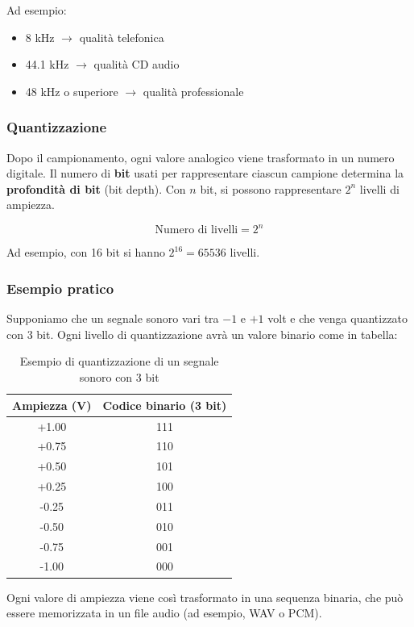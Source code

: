 \documentclass[12pt]{article}
\begin{document}
Ad esempio:
\begin{itemize}
    \item 8 kHz $\rightarrow$ qualità telefonica
    \item 44.1 kHz $\rightarrow$ qualità CD audio
    \item 48 kHz o superiore $\rightarrow$ qualità professionale
\end{itemize}

\subsubsection{Quantizzazione}

Dopo il campionamento, ogni valore analogico viene trasformato in un numero digitale.  
Il numero di \textbf{bit} usati per rappresentare ciascun campione determina la \textbf{profondità di bit} (bit depth).  
Con $n$ bit, si possono rappresentare $2^n$ livelli di ampiezza.

\[
\text{Numero di livelli} = 2^n
\]

Ad esempio, con 16 bit si hanno $2^{16} = 65536$ livelli.

\subsubsection{Esempio pratico}

Supponiamo che un segnale sonoro vari tra $-1$ e $+1$ volt e che venga quantizzato con 3 bit.  
Ogni livello di quantizzazione avrà un valore binario come in tabella:

\begin{table}[h]
\centering
\begin{tabular}{|c|c|}
\hline
\textbf{Ampiezza (V)} & \textbf{Codice binario (3 bit)} \\
\hline
+1.00 & 111 \\
+0.75 & 110 \\
+0.50 & 101 \\
+0.25 & 100 \\
-0.25 & 011 \\
-0.50 & 010 \\
-0.75 & 001 \\
-1.00 & 000 \\
\hline
\end{tabular}
\caption{Esempio di quantizzazione di un segnale sonoro con 3 bit}
\end{table}

Ogni valore di ampiezza viene così trasformato in una sequenza binaria, che può essere memorizzata in un file audio (ad esempio, WAV o PCM).
\end{document}
